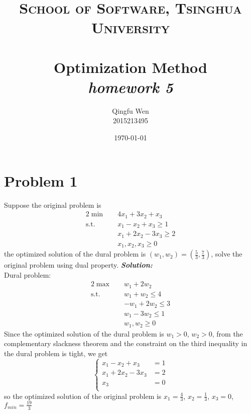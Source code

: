 \documentclass[paper=a4, fontsize=11pt]{scrartcl} %
\title{	
\normalfont \normalsize
\textsc{School of Software, Tsinghua University} \\ [25pt] %
\horrule{0.5pt} \\[0.4cm] %
\huge Optimization Method\\ %
\LARGE\textit{homework 5}
\horrule{2pt} \\[0.5cm] %
}
\author{Qingfu Wen \\ \normalsize 2015213495} %
\date{\normalsize\today} %
\numberwithin{equation}{section} %
\numberwithin{figure}{section} %
\numberwithin{table}{section} %
\begin{document}
\maketitle %
\tableofcontents
\newpage
\section{Problem 1}
Suppose the original problem is 
\begin{alignat}{2}          \nonumber
\min\quad & 4x_1+3x_2+x_3 \\    \nonumber
\mbox{s.t.}\quad            \nonumber
& x_1-x_2+x_3 \geq 1\\        \nonumber
& x_1+2x_2-3x_3 \geq 2\\         \nonumber
& x_1,x_2,x_3 \geq 0
\end{alignat}
the optimized solution of the dural problem is $(w_1,w_2)=(\frac{5}{3},\frac{7}{3})$, solve the original problem using dual property.
\emph{\textbf{Solution:}}\\
Dural problem:
\begin{alignat}{2}          \nonumber
\max\quad & w_1+2w_2 \\    \nonumber
\mbox{s.t.}\quad            \nonumber
& w_1+w_2 \leq 4\\        \nonumber
& -w_1+2w_2\leq 3\\         \nonumber
& w_1-3w_2\leq 1\\         \nonumber
& w_1,w_2 \geq 0
\end{alignat}
Since the optimized solution of the dural problem is $w_1>0$, $w_2>0$, from the complementary slackness theorem and the constraint on the third  inequality in the dural problem is tight, we get
\begin{equation}
\left\{
\begin{aligned} \nonumber
x_1-x_2+x_3 &= 1 \\
x_1+2x_2-3x_3 &=2 \\
x_3 &= 0 \\
\end{aligned}
\right.
\end{equation}
so the optimized solution of the original problem is $x_1=\frac{4}{3}$, $x_2=\frac{1}{3}$, $x_3=0$, $f_{min}=\frac{19}{3}$
\end{document}
